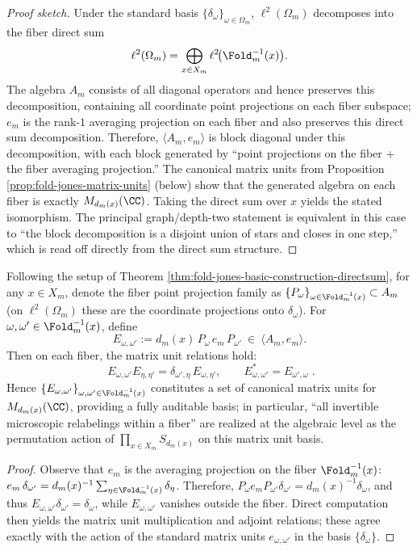 \begin{proof}[Proof sketch]
Under the standard basis \(\{\delta_\omega\}_{\omega\in\Omega_m}\), \(\ell^2(\Omega_m)\) decomposes into the fiber direct sum
\[
\ell^2(\Omega_m)=\bigoplus_{x\in X_m}\ell^2\!\bigl(\Fold_m^{-1}(x)\bigr).
\]
The algebra \(A_m\) consists of all diagonal operators and hence preserves this decomposition, containing all coordinate point projections on each fiber subspace;
\(e_m\) is the rank-\(1\) averaging projection on each fiber and also preserves this direct sum decomposition.
Therefore, \(\langle A_m,e_m\rangle\) is block diagonal under this decomposition, with each block generated by ``point projections on the fiber + the fiber averaging projection.''
The canonical matrix units from Proposition \ref{prop:fold-jones-matrix-units} (below) show that the generated algebra on each fiber is exactly \(M_{d_m(x)}(\CC)\).
Taking the direct sum over \(x\) yields the stated isomorphism.
The principal graph/depth-two statement is equivalent in this case to ``the block decomposition is a disjoint union of stars and closes in one step,'' which is read off directly from the direct sum structure. \qedhere
\end{proof}

\begin{proposition}\label{prop:fold-jones-matrix-units}
Following the setup of Theorem \ref{thm:fold-jones-basic-construction-directsum},
for any \(x\in X_m\), denote the fiber point projection family as
\(
\{P_\omega\}_{\omega\in \Fold_m^{-1}(x)}\subset A_m
\)
(on \(\ell^2(\Omega_m)\) these are the coordinate projections onto \(\delta_\omega\)).
For \(\omega,\omega'\in \Fold_m^{-1}(x)\), define
\[
E_{\omega,\omega'}:=d_m(x)\,P_\omega\,e_m\,P_{\omega'}\ \in\ \langle A_m,e_m\rangle.
\]
Then on each fiber, the matrix unit relations hold:
\[
\boxed{\;
E_{\omega,\omega'}E_{\eta,\eta'}=\delta_{\omega',\eta}\,E_{\omega,\eta'},
\qquad
E_{\omega,\omega'}^{\ast}=E_{\omega',\omega}\; }.
\]
Hence \(\{E_{\omega,\omega'}\}_{\omega,\omega'\in\Fold_m^{-1}(x)}\) constitutes a set of canonical matrix units for \(M_{d_m(x)}(\CC)\), providing a fully auditable basis;
in particular, ``all invertible microscopic relabelings within a fiber'' are realized at the algebraic level as the permutation action of
\(
\prod_{x\in X_m}S_{d_m(x)}
\)
on this matrix unit basis.
\end{proposition}

\begin{proof}
Observe that \(e_m\) is the averaging projection on the fiber \(\Fold_m^{-1}(x)\):
\(
e_m\,\delta_{\omega'}=d_m(x)^{-1}\sum_{\eta\in\Fold_m^{-1}(x)}\delta_\eta
\).
Therefore,
\(
P_\omega e_m P_{\omega'}\delta_{\omega'}
=d_m(x)^{-1}\delta_\omega
\),
and thus \(E_{\omega,\omega'}\delta_{\omega'}=\delta_\omega\), while \(E_{\omega,\omega'}\) vanishes outside the fiber.
Direct computation then yields the matrix unit multiplication and adjoint relations; these agree exactly with the action of the standard matrix units \(e_{\omega,\omega'}\) in the basis \(\{\delta_\omega\}\). \qedhere
\end{proof}
